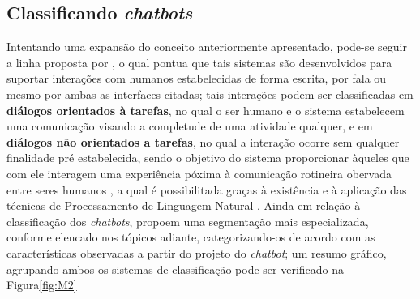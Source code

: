 \subsection{Classificando \textit{chatbots}}
Intentando uma expansão do conceito anteriormente apresentado, pode-se seguir a linha proposta por , o qual pontua que tais sistemas são desenvolvidos para suportar interações com humanos estabelecidas de forma escrita, por fala ou mesmo por ambas as interfaces citadas; tais interações podem ser classificadas em \textbf{diálogos orientados à tarefas}, no qual o ser humano e o sistema estabelecem uma comunicação visando a completude de uma atividade qualquer, e em \textbf{diálogos não orientados a tarefas}, no qual a interação ocorre sem qualquer finalidade pré estabelecida, sendo o objetivo do sistema proporcionar àqueles que com ele interagem uma experiência póxima à comunicação rotineira obervada entre seres humanos \cite{wezel2020m}, a qual é possibilitada graças à existência e à aplicação das técnicas de Processamento de Linguagem Natural \cite{lokman2018modern}. Ainda em relação à classificação dos \textit{chatbots},  propoem uma segmentação mais especializada, conforme elencado nos tópicos adiante, categorizando-os de acordo com as características observadas a partir do projeto do \textit{chatbot}; um resumo gráfico, agrupando ambos os sistemas de classificação pode ser verificado na Figura\ref{fig:M2}

